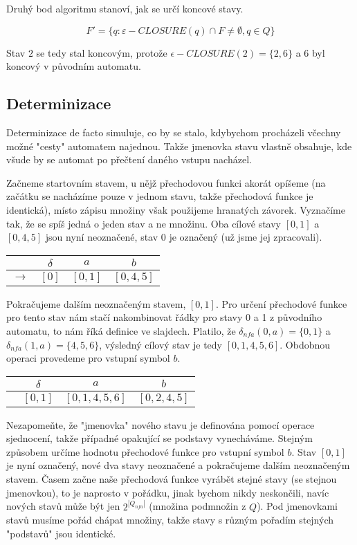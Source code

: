 \documentclass{article}
\begin{document}
Druhý bod algoritmu stanoví, jak se určí koncové stavy.

$$F'=\{q:\varepsilon-CLOSURE(q)\cap F\neq\emptyset,q\in Q\}$$

Stav $2$ se tedy stal koncovým, protože $\epsilon-CLOSURE(2) = \{2,6\}$ a $6$ byl koncový v původním automatu.

\subsection{Determinizace}

Determinizace de facto simuluje, co by se stalo, kdybychom procházeli včechny možné "cesty" automatem najednou. Takže jmenovka stavu vlastně obsahuje, kde všude by se automat po přečtení daného vstupu nacházel.

Začneme startovním stavem, u nějž přechodovou funkci akorát opíšeme (na začátku se nacházíme pouze v jednom stavu, takže přechodová funkce je identická), místo zápisu množiny však použijeme hranatých závorek. Vyznačíme tak, že se spíš jedná o jeden stav a ne množinu. Oba cílové stavy $[0,1]$ a $[0,4,5]$ jsou nyní neoznačené, stav $0$ je označený (už jsme jej zpracovali).


\begin{tabular}{|rc||c|c|}
\hline
 & $\delta$ &      $a$ &   $b$\\
\hline
\hline
$\rightarrow$ & $[0]$ &   $[0,1]$ &       $[0,4,5]$\\
\hline
\end{tabular}


Pokračujeme dalším neoznačeným stavem, $[0,1]$.
Pro určení přechodové funkce pro tento stav nám stačí nakombinovat řádky pro stavy 0 a 1 z původního automatu, to nám říká definice ve slajdech.
Platilo, že $\delta_{nfa}(0,a) = \{0,1\}$ a $\delta_{nfa}(1,a) = \{4,5,6\}$, výsledný cílový stav je tedy $[0,1,4,5,6]$. Obdobnou operaci provedeme pro vstupní symbol $b$.

\begin{tabular}{|rc||c|c|}
\hline
 & $\delta$ &      $a$ &   $b$\\
\hline
\hline
 & $[0,1]$ &       $[0,1,4,5,6]$ & $[0,2,4,5]$\\
\hline
\end{tabular}

Nezapomeňte, že "jmenovka" nového stavu je definována pomocí operace sjednocení, takže případné opakující se podstavy vynecháváme. Stejným způsobem určíme hodnotu přechodové funkce pro vstupní symbol $b$.
Stav $[0,1]$ je nyní označený, nové dva stavy neoznačené a pokračujeme dalším neoznačeným stavem. Časem začne naše přechodová funkce vyrábět stejné stavy (se stejnou jmenovkou), to je naprosto v pořádku, jinak bychom nikdy neskončili, navíc nových stavů může být jen $2^{|Q_{nfa}|}$ (množina podmnožin z $Q$). Pod jmenovkami stavů musíme pořád chápat množiny, takže stavy s různým pořadím stejných "podstavů" jsou identické.
\end{document}
